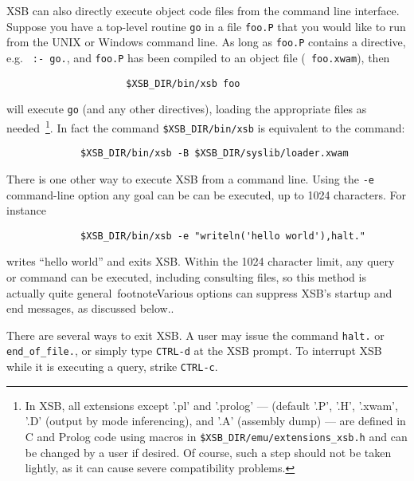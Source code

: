 XSB can also directly execute object code files from the command line
interface.  Suppose you have a top-level routine {\tt go} in a file
{\tt foo.P} that you would like to run from the UNIX or Windows
command line.  As long as {\tt foo.P} contains a directive, e.g. {\tt
  :- go.}, and {\tt foo.P} has been compiled to an object file ({\tt
  foo.xwam}), then
\begin{verbatim}
                     $XSB_DIR/bin/xsb foo
\end{verbatim}
will execute {\tt go} (and any other directives), loading the
appropriate files as needed~\footnote{In XSB, all extensions except
  '.pl' and '.prolog' --- (default '.P', '.H', '.xwam', '.D' (output by mode
  inferencing), and '.A' (assembly dump) --- are defined in C and
  Prolog code using macros in {\tt \$XSB\_DIR/emu/extensions\_xsb.h}
  and can be changed by a user if desired.  Of course, such a step
  should not be taken lightly, as it can cause severe compatibility
  problems.}.
%
In fact the command
\verb'$XSB_DIR/bin/xsb' is equivalent to the command:
\begin{verbatim}
             $XSB_DIR/bin/xsb -B $XSB_DIR/syslib/loader.xwam
\end{verbatim}
There is one other way to execute XSB from a command line.  Using the
{\tt -e} command-line option any goal can be can be executed, up to
1024 characters.  For instance 
\begin{verbatim}
             $XSB_DIR/bin/xsb -e "writeln('hello world'),halt."
\end{verbatim}
writes ``hello world'' and exits XSB.  Within the 1024 character
limit, any query or command can be executed, including consulting
files, so this method is actually quite general~footnote{Various
  options can suppress XSB's startup and end messages, as discussed
  below.}.

There are several ways to exit XSB.  A user may issue the
command \verb'halt.' or \verb'end_of_file.', or simply type
\verb'CTRL-d' at the XSB prompt.  To interrupt XSB
while it is executing a query, strike \verb'CTRL-c'.

